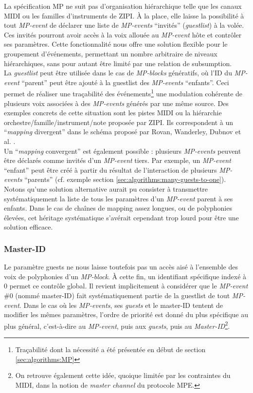 \noindent La spécification MP ne suit pas d'organisation hiérarchique telle que les canaux \gls{MIDI} ou les familles d'instruments de \gls{ZIPI}. À la place, elle laisse la possibilité à tout \textit{MP-event} de déclarer une liste de \textit{MP-events} ``invités'' (\textit{guestlist}) à la volée. Ces invités pourront avoir accès à la voix allouée au \textit{MP-event} hôte et contrôler ses paramètres. Cette fonctionnalité nous offre une solution flexible pour le groupement d'événements, permettant un nombre arbitraire de niveaux hiérarchiques, sans pour autant être limité par une relation de subsumption.\\
\indent La \textit{guestlist} peut être utilisée dans le cas de \textit{MP-blocks} génératifs, où l'ID du \textit{MP-event} ``parent'' peut être ajouté à la guestlist des \textit{MP-events} ``enfants''. Ceci permet de réaliser une traçabilité des événements\footnote{Traçabilité dont la nécessité a été présentée en début de section \ref{sec:algorithms:MP}} une modulation cohérente de plusieurs voix associées à des \textit{MP-events} générés par une même source. Des exemples concrets de cette situation sont les pistes \gls{MIDI} ou la hiérarchie orchestre/famille/instrument/note proposée par \gls{ZIPI}. Ils correspondent à un ``\textit{\gls{mapping}} divergent'' dans le schéma proposé par Rovan, Wanderley, Dubnov et al. \cite{rovan_instrumental_1997}.\\
\indent Un ``\textit{\gls{mapping}} convergent'' est également possible : plusieurs \textit{MP-events} peuvent être déclarés comme invités d'un \textit{MP-event} tiers. Par exemple, un \textit{MP-event} ``enfant'' peut être créé à partir du résultat de l'interaction de plusieurs \textit{MP-events} ``parents'' (cf. exemple section \ref{sec:algorithms:many-guests-to-one}).\\
\indent Notons qu'une solution alternative aurait pu consister à transmettre systématiquement la liste de tous les paramètres d'un \textit{MP-event} parent à ses enfants. Dans le cas de chaînes de mapping assez longues, ou de polyphonies élevées, cet héritage systématique s'avérait cependant trop lourd pour être une solution efficace.


\subsubsection{Master-ID}

\noindent Le paramètre guests ne nous laisse toutefois pas un accès aisé à l'ensemble des voix de polyphonies d'un \textit{MP-block}. À cette fin, un identifiant spécifique indexé à 0 permet ce contrôle global. Il revient implicitement à considérer que le \textit{MP-event} \#0 (nommé master-ID) fait systématiquement partie de la guestlist de tout \textit{MP-event}. Dans le cas où les \textit{MP-events}, ses \textit{guests} et le master-ID tentent de modifier les mêmes paramètres, l'ordre de priorité est donné du plus spécifique au plus général, c'est-à-dire au \textit{MP-event}, puis aux \textit{guests}, puis au \textit{Master-ID}\footnote{On retrouve également cette idée, quoique limitée par les contraintes du \gls{MIDI}, dans la notion de \textit{master channel} du protocole \gls{MPE}.}.

